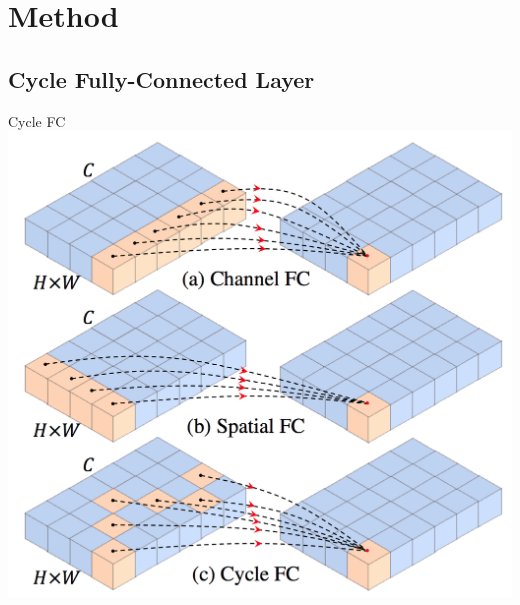 \documentclass{beamer}
\begin{document}
\section{Method}

\subsection{Cycle Fully-Connected Layer}

\begin{frame}{Cycle FC}
    \centering
    \includegraphics[height=.8\textheight]{figures/teaser.png}
\end{frame}
\end{document}
